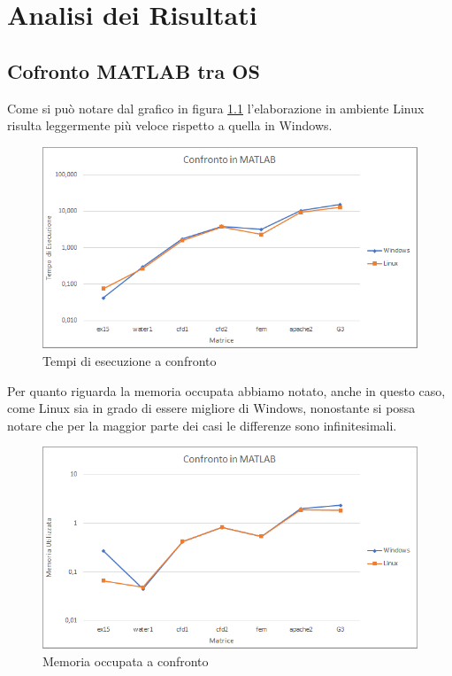 \documentclass[a4paper,12pt,titlepage,oneside]{book}
\begin{document}
\chapter{Analisi dei Risultati}
    \section{Cofronto MATLAB tra OS}
    \noindent Come si può notare dal grafico in figura \ref{plot:timemat} l'elaborazione in ambiente Linux risulta leggermente più veloce rispetto a quella in Windows.
    \begin{figure}[ht]
        \centering
        \includegraphics[scale=0.8]{src/plot/TimeMAT.png}
        \caption{Tempi di esecuzione a confronto}
        \label{plot:timemat}
    \end{figure}
    
    \noindent Per quanto riguarda la memoria occupata abbiamo notato, anche in questo caso, come Linux sia in grado di essere migliore di Windows, nonostante si possa notare che per la maggior parte dei casi le differenze sono infinitesimali.\\[0.5cm]
    \begin{figure}[ht]
        \centering
        \includegraphics[scale=0.8]{src/plot/MemMAT.png}
        \caption{Memoria occupata a confronto}
        \label{plot:memmat}
    \end{figure}
    
\end{document}
